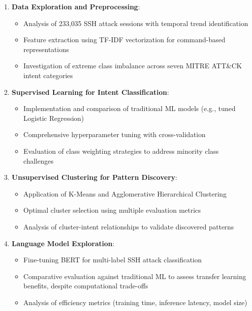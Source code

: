 \documentclass[acmlarge,screen,nonacm]{acmart}
\begin{document}
\begin{enumerate}
    \item \textbf{Data Exploration and Preprocessing}: 
    \begin{itemize}
        \item Analysis of 233,035 SSH attack sessions with temporal trend identification
        \item Feature extraction using TF-IDF vectorization for command-based representations
        \item Investigation of extreme class imbalance across seven MITRE ATT\&CK intent categories
    \end{itemize}
    
    \item \textbf{Supervised Learning for Intent Classification}:
    \begin{itemize}
        \item Implementation and comparison of traditional ML models (e.g., tuned Logistic Regression)
        \item Comprehensive hyperparameter tuning with cross-validation
        \item Evaluation of class weighting strategies to address minority class challenges
    \end{itemize}
    
    \item \textbf{Unsupervised Clustering for Pattern Discovery}:
    \begin{itemize}
        \item Application of K-Means and Agglomerative Hierarchical Clustering
        \item Optimal cluster selection using multiple evaluation metrics
        \item Analysis of cluster-intent relationships to validate discovered patterns
    \end{itemize}
    
    \item \textbf{Language Model Exploration}:
    \begin{itemize}
        \item Fine-tuning BERT for multi-label SSH attack classification
        \item Comparative evaluation against traditional ML to assess transfer learning benefits, despite computational trade-offs
        \item Analysis of efficiency metrics (training time, inference latency, model size)
    \end{itemize}
\end{enumerate}
\end{document}
